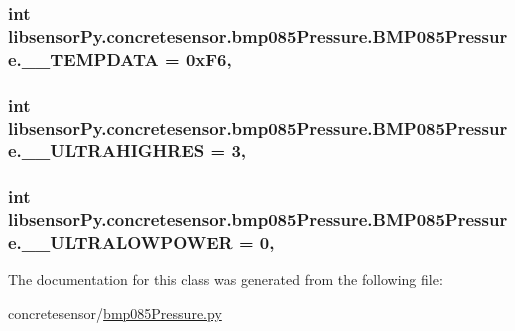 \subsubsection[{\+\_\+\+\_\+\+T\+E\+M\+P\+D\+A\+T\+A}]{\setlength{\rightskip}{0pt plus 5cm}int libsensor\+Py.\+concretesensor.\+bmp085\+Pressure.\+B\+M\+P085\+Pressure.\+\_\+\+\_\+\+T\+E\+M\+P\+D\+A\+T\+A = 0x\+F6\hspace{0.3cm}{\ttfamily [static]}, {\ttfamily [private]}}\label{classlibsensorPy_1_1concretesensor_1_1bmp085Pressure_1_1BMP085Pressure_a0042ae13bd77f91677df1fe18e4306f4}
\hypertarget{classlibsensorPy_1_1concretesensor_1_1bmp085Pressure_1_1BMP085Pressure_ae3d748a00ffffad810a81741d603ba6b}{}
\subsubsection[{\+\_\+\+\_\+\+U\+L\+T\+R\+A\+H\+I\+G\+H\+R\+E\+S}]{\setlength{\rightskip}{0pt plus 5cm}int libsensor\+Py.\+concretesensor.\+bmp085\+Pressure.\+B\+M\+P085\+Pressure.\+\_\+\+\_\+\+U\+L\+T\+R\+A\+H\+I\+G\+H\+R\+E\+S = 3\hspace{0.3cm}{\ttfamily [static]}, {\ttfamily [private]}}\label{classlibsensorPy_1_1concretesensor_1_1bmp085Pressure_1_1BMP085Pressure_ae3d748a00ffffad810a81741d603ba6b}
\hypertarget{classlibsensorPy_1_1concretesensor_1_1bmp085Pressure_1_1BMP085Pressure_a5d854be7ccc776a78dd91615461104bb}{}
\subsubsection[{\+\_\+\+\_\+\+U\+L\+T\+R\+A\+L\+O\+W\+P\+O\+W\+E\+R}]{\setlength{\rightskip}{0pt plus 5cm}int libsensor\+Py.\+concretesensor.\+bmp085\+Pressure.\+B\+M\+P085\+Pressure.\+\_\+\+\_\+\+U\+L\+T\+R\+A\+L\+O\+W\+P\+O\+W\+E\+R = 0\hspace{0.3cm}{\ttfamily [static]}, {\ttfamily [private]}}\label{classlibsensorPy_1_1concretesensor_1_1bmp085Pressure_1_1BMP085Pressure_a5d854be7ccc776a78dd91615461104bb}


The documentation for this class was generated from the following file\+:\begin{DoxyCompactItemize}
\item 
concretesensor/\hyperlink{concretesensor_2bmp085Pressure_8py}{bmp085\+Pressure.\+py}\end{DoxyCompactItemize}
